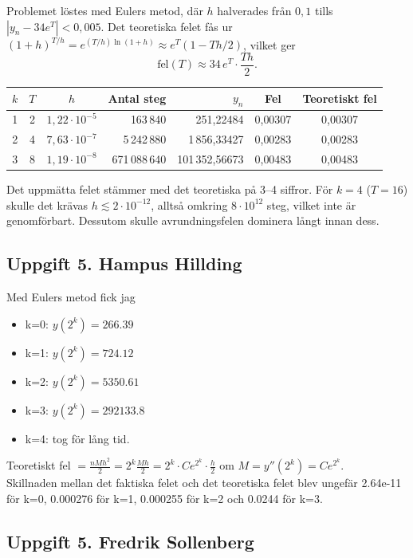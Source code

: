 \documentclass{article}
\begin{document}
Problemet löstes med Eulers metod, där $h$ halverades från $0{,}1$ tills
$|y_n - 34e^{T}| < 0{,}005$. Det teoretiska felet fås ur
$(1+h)^{T/h} = e^{(T/h)\ln(1+h)} \approx e^{T}(1 - Th/2)$, vilket ger
\[
  \text{fel}(T) \approx 34\, e^{T} \cdot \frac{T h}{2}.
\]

\begin{center}
\begin{tabular}{c c c r r c c}
\hline
$k$ & $T$ & $h$ & Antal steg & $y_n$ & Fel & Teoretiskt fel \\
\hline
1 & 2 & $1{,}22 \cdot 10^{-5}$ & 163\,840     & 251{,}22484     & 0{,}00307 & 0{,}00307 \\
2 & 4 & $7{,}63 \cdot 10^{-7}$ & 5\,242\,880   & 1\,856{,}33427  & 0{,}00283 & 0{,}00283 \\
3 & 8 & $1{,}19 \cdot 10^{-8}$ & 671\,088\,640 & 101\,352{,}56673 & 0{,}00483 & 0{,}00483 \\
\hline
\end{tabular}
\end{center}

Det uppmätta felet stämmer med det teoretiska på 3--4 siffror. För $k = 4$
($T = 16$) skulle det krävas $h \lesssim 2 \cdot 10^{-12}$, alltså omkring
$8 \cdot 10^{12}$ steg, vilket inte är genomförbart. Dessutom skulle
avrundningsfelen dominera långt innan dess.

\subsection*{Uppgift 5. Hampus Hillding}
Med Eulers metod fick jag
    \begin{itemize}
        \item k=0: $y(2^k)=266.39$
        \item k=1: $y(2^k)=724.12$
        \item k=2: $y(2^k)=5350.61$
        \item k=3: $y(2^k)=292133.8$
        \item k=4: tog för lång tid.
    \end{itemize}

Teoretiskt fel $= \frac{nMh^2}{2} = 2^k \frac{Mh}{2}=2^k\cdot Ce^{2^k}\cdot \frac{h}{2}$  om $M=y''(2^k)=Ce^{2^k}$.
\\Skillnaden mellan det faktiska felet och det teoretiska felet blev ungefär 2.64e-11 för k=0, 0.000276 för k=1, 0.000255 för k=2 och 0.0244 för k=3.
\subsection*{Uppgift 5. Fredrik Sollenberg}
\end{document}
